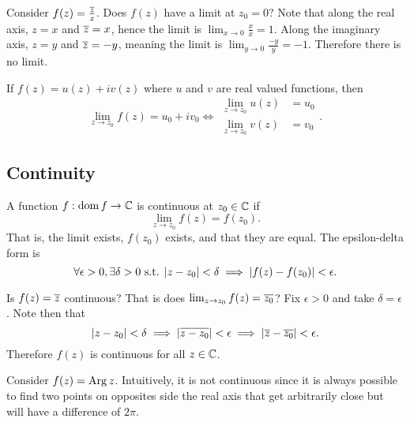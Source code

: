 \documentclass[../notes.tex]{subfiles}
\begin{document}
\begin{example}
    Consider $f(z) = \frac{\overline{z}}{z}$. Does $f(z)$ have a limit at $z_0 = 0$? Note that along the real axis, $z = x$ and $\overline{z} = x$, hence the limit is $\lim_{x\to 0}\frac{x}{x} = 1$. Along the imaginary axis, $z = y$ and $\overline{z} = -y$, meaning the limit is $\lim_{y\to 0} \frac{-y}{y} = -1$. Therefore there is no limit.
\end{example}

\begin{theorem}
    \label{thm:limitequivalence}
    If $f(z) = u(z) + iv(z)$ where $u$ and $v$ are real valued functions, then
    \[
        \renewcommand{\arraystretch}{1.5}
        \lim_{z \to z_0} f(z) = u_0 + iv_0 \Longleftrightarrow \begin{array}{rl}
            \displaystyle
            \lim_{z\to z_0} u(z) &= u_0 \\
            \displaystyle
            \lim_{z\to z_0} v(z) &= v_0
        \end{array}
    .\]
\end{theorem}

\subsection{Continuity}

\begin{definition}[Continuity]
    A function $f : \operatorname{dom} f \to \mathbb{C}$ is continuous at $z_0 \in \mathbb{C}$ if
    \[
        \lim_{z \to z_0} f(z) = f(z_0)
    .\]
    That is, the limit exists, $f(z_0)$ exists, and that they are equal. The epsilon-delta form is
    \[
        \forall \epsilon > 0, \exists \delta > 0 \text{ s.t. } |z - z_0| < \delta \implies |f(z) - f(z_0)| < \epsilon
    .\]
\end{definition}

\begin{example}
    Is $f(z) = \overline{z}$ continuous? That is does $\lim_{z \to z_0} f(z) = \overline{z_0}$? Fix $\epsilon > 0$ and take $\delta = \epsilon$. Note then that
    \[
        |z - z_0| < \delta \implies |\overline{z - z_0}| < \epsilon \implies |\overline{z} - \overline{z_0}| < \epsilon
    .\]
    Therefore $f(z)$ is continuous for all $z \in \mathbb{C}$.
\end{example}

\begin{example}
    Consider $f(z) = \operatorname{Arg} z$. Intuitively, it is not continuous since it is always possible to find two points on opposites side the real axis that get arbitrarily close but will have a difference of $2 \pi$.
\end{example}
\end{document}
